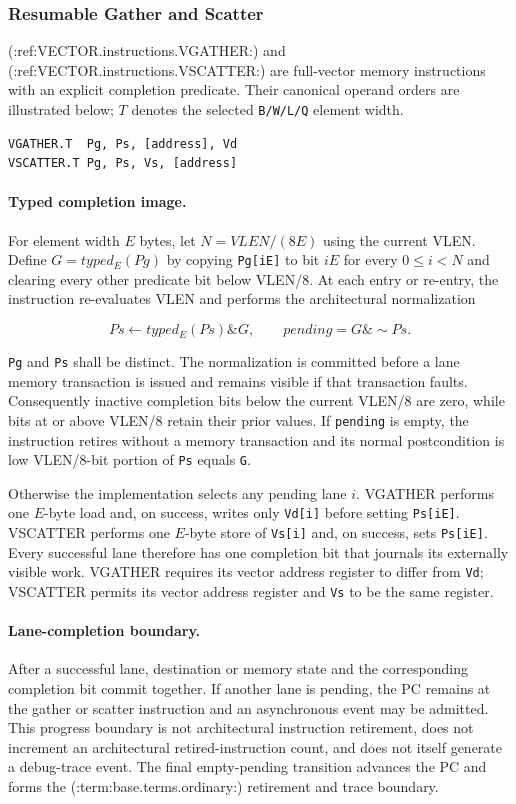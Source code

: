 \subsubsection{Resumable Gather and Scatter}

(:ref:VECTOR.instructions.VGATHER:) and (:ref:VECTOR.instructions.VSCATTER:)
are full-vector memory instructions with an explicit completion predicate.
Their canonical operand orders are illustrated below; $T$ denotes the selected
\texttt{B/W/L/Q} element width.

\begin{verbatim}
VGATHER.T  Pg, Ps, [address], Vd
VSCATTER.T Pg, Ps, Vs, [address]
\end{verbatim}

\paragraph{Typed completion image.}
For element width $E$ bytes, let $N=VLEN/(8E)$ using the current VLEN. Define $G=typed_E(Pg)$ by
copying \texttt{Pg[iE]} to bit $iE$ for every $0\leq i<N$ and clearing every
other predicate bit below VLEN/8. At each entry or re-entry, the
instruction re-evaluates VLEN and performs the
architectural normalization

\[
  Ps \leftarrow typed_E(Ps) \mathbin{\&} G,
  \qquad pending = G \mathbin{\&} \mathop{\sim}Ps.
\]

\texttt{Pg} and \texttt{Ps} shall be distinct.  The normalization is committed
before a lane memory transaction is issued and remains visible if that
transaction faults. Consequently inactive completion bits below the current
VLEN/8 are zero, while bits at or above VLEN/8 retain their prior values. If
\texttt{pending} is empty, the
instruction
retires without a memory transaction and its normal postcondition is
low VLEN/8-bit portion of \texttt{Ps} equals \texttt{G}.

Otherwise the implementation selects any pending lane $i$.  VGATHER performs
one $E$-byte load and, on success, writes only \texttt{Vd[i]} before setting
\texttt{Ps[iE]}.  VSCATTER performs one $E$-byte store of \texttt{Vs[i]} and,
on success, sets \texttt{Ps[iE]}.  Every successful lane therefore has one
completion bit that journals its externally visible work.  VGATHER requires
its vector address register to differ from \texttt{Vd}; VSCATTER permits its
vector address register and \texttt{Vs} to be the same register.

\paragraph{Lane-completion boundary.}
After a successful lane, destination or memory state and the corresponding
completion bit commit together.  If another lane is pending, the PC remains at
the gather or scatter instruction and an asynchronous event may be admitted.
This progress boundary is not architectural instruction retirement, does not
increment an architectural retired-instruction count, and does not itself
generate a debug-trace event.  The final empty-pending transition advances the
PC and forms the (:term:base.terms.ordinary:) retirement and trace boundary.

